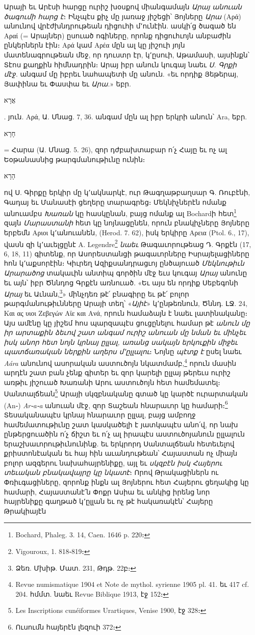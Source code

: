\documentclass{article}
\begin{document}
{Արայի եւ Արէսի հարցը ուրիշ խօսքով միանգամայն \emph{Արայ անուան ծագումի հարց է}։ Ինչպէս քիչ մը յառաջ յիշեցի՝ Յոյները \emph{Արա} (Αρά) անունով վրէժխնդրութեան դիցուհի մ՚ունէին. ասկի՛ց ծագած են Αραί (= Արայներ) ըսուած ոգիները, որոնք դիցուհւոյն անբաժին ընկերներն էին։ Αρά կամ Αρέα մըն ալ կը յիշուի յոյն մատենագրութեան մեջ, որ դուստր էր, կ՚ըսուի, Աթամասի, այսինքն՝ Տէոս քաղքին հիմնադրին։ Արայ իբր անուն կուգայ նաեւ \emph{Ս. Գրքի մէջ.} անգամ մը իբրեւ նահապետի մը անուն. «եւ որդիք Յեթերայ, Յափինա եւ Փասփա եւ \emph{Արա.}» եբր. \begin{hebrewfont}אֲרָא\end{hebrewfont}. յուն. Αρά, Ա. Մնաց. 7, 36. անգամ մըն ալ իբր երկրի անուն՝ Ara, եբր. \begin{hebrewfont}חָרָא\end{hebrewfont} = Հարա (Ա. Մնաց. 5. 26), զոր դժբախտաբար ո՛չ Հայը եւ ոչ ալ Եօթանասնից թարգմանութիւնը ունին։ \begin{hebrewfont}הָרָא\end{hebrewfont} ով Ս. Գիրքը երկիր մը կ՚ակնարկէ, ուր Թագղաթբաղսար Գ. Ռուբէնի, Գադայ եւ Մանասէի ցեղերը տարագրեց։ Մեկնիչներէն ոմանք անուամբս \emph{Խառան} կը հասկընան, բայց ոմանք ալ Bochardի հետ\footnote{Bochard, Phaleg. 3. 14, Caen. 1646 p. 220։} զայն \emph{Մարաստանի} հետ կը նոյնացընեն, որուն բնակիչները Յոյները երբեմն Αριοι կ՚անուանեն, (Herod. 7. 62), իսկ երկիրը Αρεια (Ptol. 6., 17), վասն զի կ՚աւելցընէ A. Legendre\footnote{Vigouroux, 1. 818֊819։} \emph{նաեւ} Թագաւորութեաց Դ. Գրքէն (17, 6, 18, 11) գիտենք, որ Ասորեստանցի թագաւորները Իսրայելացիները հոն կ՚աքսորէին։ Կիւրեղ Ազիքսանդրացւոյ ընծայուած \emph{Մեկնութիւն Արարածոց} տակաւին անտիպ գործին մէջ եւս կուգայ \emph{Արայ} անունը եւ այն՝ իբր Ծննդոց Գրքէն առնուած. «Եւ այս են որդիք Սեբեգոնի \emph{Արայ} եւ Աւնան,\footnote{Ձեռ. Մխիթ. Մատ. 231, Թդթ. 22բ։}» մինչդեռ թէ՛ բնագիրը եւ թէ՛ բոլոր թարգմանութիւնները Արայի տեղ՝ «\emph{Այիէ}» կ՚ընթեռնուն, Ծննդ. ԼՋ. 24, Και ας υιοι Ζεβεγών Αϊε και Ανά, որուն համաձայն է նաեւ լատինականը։ Այս ամէնը կը յիշեմ հոս պարզապէս ցուցընելու համար թէ \emph{անուն մը իր արտաքին ձեւով շատ անգամ ուրիշ անուան մը նման եւ մինչեւ իսկ անոր հետ նոյն կրնայ ըլլալ, առանց սակայն երկուքին միջեւ պատճառական ներքին աղերս մ՚ըլլալու}։ Նոյնը \emph{պէտք է} ըսել նաեւ \emph{Aára} անունով ասորական աստուծոյն նկատմամբ,\footnote{Revue numismatique 1904 et Note de mythol. syrienne 1905 pl. 41. եւ 417 cf. 204. հմմտ. նաեւ Revue Biblique 1913, էջ 152։} որուն մասին արդէն շատ բան չենք գիտեր եւ զոր կարելի ըլլայ թերեւս ուրիշ առթիւ յիշուած Խառանի Արու աստուծոյն հետ համեմատել։ Սանտալճեան\footnote{Les Inscriptions cunéiformes Urartiques, Venise 1900, էջ 328։} Արայի սկզբնականը գտած կը կարծէ ուրարտական (An֊) \emph{Ar֊a֊a} անուան մէջ, զոր Տաշեան հնարաւոր կը համարի։\footnote{Ուսումն հայերէն լեզուի 372։} Տեսականապէս կրնայ հնարաւոր ըլլալ, բայց ամբողջ համեմատութիւնը շատ կասկածելի է յատկապէս անո՛վ, որ նախ ընթերցուածին ո՛չ ճիշտ եւ ո՛չ ալ իրապէս աստուծոյանուն ըլլալուն երաշխաւորութիւնունինք. եւ երկրորդ Սանտալճեան հետեւելով քրիստոնէական եւ հայ հին աւանդութեան՝ Հայաստան ոչ միայն բոլոր ազգերու նախահայրենիքը, այլ եւ \emph{սկզբէն իսկ Հայերու տեւական բնակավայրը կը նկատէ}։ Որով Թրակացիներն ու Փռիւգացիները, զորոնք ինքն ալ Յոյներու հետ Հայերու ցեղակից կը համարի, Հայաստանէ՛ն Փոքր Ասիա եւ անկից իրենց նոր հայրենիքը գաղթած կ՚ըլլան եւ ոչ թէ հակառակէն՝ Հայերը Թրակիայէն }
\end{document}

